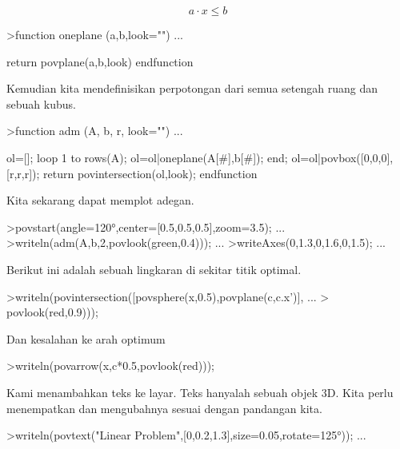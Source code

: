\documentclass[a4paper,10pt]{article}
\begin{document}
\begin{eulernotebook}
\begin{eulercomment}
\begin{eulercomment}
\begin{eulercomment}
\begin{eulercomment}
\begin{eulercomment}
\begin{eulercomment}
\begin{eulercomment}
\begin{eulercomment}
\begin{eulercomment}
\begin{eulercomment}
\begin{eulercomment}
\end{eulercomment}
\begin{eulerformula}
\[
a \cdot x \le b
\]
\end{eulerformula}
\begin{eulerprompt}
>function oneplane (a,b,look="") ...
\end{eulerprompt}
\begin{eulerudf}
    return povplane(a,b,look)
  endfunction
\end{eulerudf}
\begin{eulercomment}
Kemudian kita mendefinisikan perpotongan dari semua setengah ruang dan
sebuah kubus.
\end{eulercomment}
\begin{eulerprompt}
>function adm (A, b, r, look="") ...
\end{eulerprompt}
\begin{eulerudf}
    ol=[];
    loop 1 to rows(A); ol=ol|oneplane(A[#],b[#]); end;
    ol=ol|povbox([0,0,0],[r,r,r]);
    return povintersection(ol,look);
  endfunction
\end{eulerudf}
\begin{eulercomment}
Kita sekarang dapat memplot adegan.
\end{eulercomment}
\begin{eulerprompt}
>povstart(angle=120°,center=[0.5,0.5,0.5],zoom=3.5); ...
>writeln(adm(A,b,2,povlook(green,0.4))); ...
>writeAxes(0,1.3,0,1.6,0,1.5); ...
\end{eulerprompt}
\begin{eulercomment}
Berikut ini adalah sebuah lingkaran di sekitar titik optimal.
\end{eulercomment}
\begin{eulerprompt}
>writeln(povintersection([povsphere(x,0.5),povplane(c,c.x')], ...
>  povlook(red,0.9)));
\end{eulerprompt}
\begin{eulercomment}
Dan kesalahan ke arah optimum
\end{eulercomment}
\begin{eulerprompt}
>writeln(povarrow(x,c*0.5,povlook(red)));
\end{eulerprompt}
\begin{eulercomment}
Kami menambahkan teks ke layar. Teks hanyalah sebuah objek 3D. Kita
perlu menempatkan dan mengubahnya sesuai dengan pandangan kita.
\end{eulercomment}
\begin{eulerprompt}
>writeln(povtext("Linear Problem",[0,0.2,1.3],size=0.05,rotate=125°)); ...

\end{eulerprompt}
\end{eulercomment}
\end{eulercomment}
\end{eulercomment}
\end{eulercomment}
\end{eulercomment}
\end{eulercomment}
\end{eulercomment}
\end{eulercomment}
\end{eulercomment}
\end{eulercomment}
\end{eulernotebook}
\end{document}

